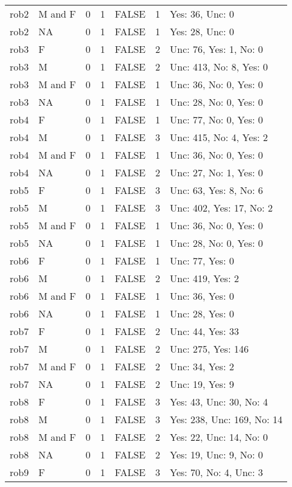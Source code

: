 \documentclass[
]{article}
\begin{document}
\begin{longtable}[]{@{}llrrlrl@{}}
rob2 & M and F & 0 & 1 & FALSE & 1 & Yes: 36, Unc: 0 \\
rob2 & NA & 0 & 1 & FALSE & 1 & Yes: 28, Unc: 0 \\
rob3 & F & 0 & 1 & FALSE & 2 & Unc: 76, Yes: 1, No: 0 \\
rob3 & M & 0 & 1 & FALSE & 2 & Unc: 413, No: 8, Yes: 0 \\
rob3 & M and F & 0 & 1 & FALSE & 1 & Unc: 36, No: 0, Yes: 0 \\
rob3 & NA & 0 & 1 & FALSE & 1 & Unc: 28, No: 0, Yes: 0 \\
rob4 & F & 0 & 1 & FALSE & 1 & Unc: 77, No: 0, Yes: 0 \\
rob4 & M & 0 & 1 & FALSE & 3 & Unc: 415, No: 4, Yes: 2 \\
rob4 & M and F & 0 & 1 & FALSE & 1 & Unc: 36, No: 0, Yes: 0 \\
rob4 & NA & 0 & 1 & FALSE & 2 & Unc: 27, No: 1, Yes: 0 \\
rob5 & F & 0 & 1 & FALSE & 3 & Unc: 63, Yes: 8, No: 6 \\
rob5 & M & 0 & 1 & FALSE & 3 & Unc: 402, Yes: 17, No: 2 \\
rob5 & M and F & 0 & 1 & FALSE & 1 & Unc: 36, No: 0, Yes: 0 \\
rob5 & NA & 0 & 1 & FALSE & 1 & Unc: 28, No: 0, Yes: 0 \\
rob6 & F & 0 & 1 & FALSE & 1 & Unc: 77, Yes: 0 \\
rob6 & M & 0 & 1 & FALSE & 2 & Unc: 419, Yes: 2 \\
rob6 & M and F & 0 & 1 & FALSE & 1 & Unc: 36, Yes: 0 \\
rob6 & NA & 0 & 1 & FALSE & 1 & Unc: 28, Yes: 0 \\
rob7 & F & 0 & 1 & FALSE & 2 & Unc: 44, Yes: 33 \\
rob7 & M & 0 & 1 & FALSE & 2 & Unc: 275, Yes: 146 \\
rob7 & M and F & 0 & 1 & FALSE & 2 & Unc: 34, Yes: 2 \\
rob7 & NA & 0 & 1 & FALSE & 2 & Unc: 19, Yes: 9 \\
rob8 & F & 0 & 1 & FALSE & 3 & Yes: 43, Unc: 30, No: 4 \\
rob8 & M & 0 & 1 & FALSE & 3 & Yes: 238, Unc: 169, No: 14 \\
rob8 & M and F & 0 & 1 & FALSE & 2 & Yes: 22, Unc: 14, No: 0 \\
rob8 & NA & 0 & 1 & FALSE & 2 & Yes: 19, Unc: 9, No: 0 \\
rob9 & F & 0 & 1 & FALSE & 3 & Yes: 70, No: 4, Unc: 3 \\

\end{longtable}
\end{document}
